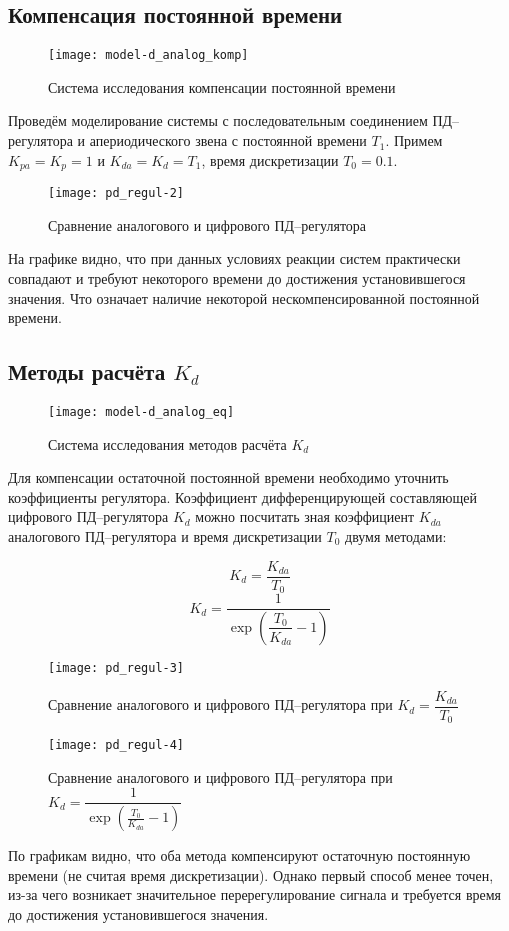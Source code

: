         \subsection{Компенсация постоянной времени}
            \begin{figure}[H]
                \centering\texttt{[image: model-d\_analog\_komp]}
                \caption{Система исследования компенсации постоянной времени}
            \end{figure}
            Проведём моделирование системы с последовательным соединением ПД--регулятора и апериодического звена с постоянной времени $ T_1 $. Примем $ K_{pa}=K_p=1 $ и $ K_{da} = K_d = T_1 $, время дискретизации $ T_0 = 0.1$.
            \begin{figure}[H]
                \centering\texttt{[image: pd\_regul-2]}
                \caption{Сравнение аналогового и цифрового ПД--регулятора}
            \end{figure}
            На графике видно, что при данных условиях реакции систем практически совпадают и требуют некоторого времени до достижения установившегося значения. Что означает наличие некоторой нескомпенсированной постоянной времени.

        \subsection{Методы расчёта $ K_d $}
            \begin{figure}[H]
                \centering\texttt{[image: model-d\_analog\_eq]}
                \caption{Система исследования методов расчёта $ K_d $}
            \end{figure}
            Для компенсации остаточной постоянной времени необходимо уточнить коэффициенты регулятора.
            Коэффициент дифференцирующей составляющей цифрового ПД--регулятора $ K_d $ можно посчитать зная коэффициент $ K_{da} $ аналогового ПД--регулятора и время дискретизации $ T_0 $ двумя методами:
            
            $$  K_d = \dfrac{K_{da}}{T_0}  $$ 
            $$  K_d = \dfrac{1}{\exp\left(\dfrac{T_0}{K_{da}}-1\right)}  $$
            \begin{figure}[H]
                \centering\texttt{[image: pd\_regul-3]}
                \caption{Сравнение аналогового и цифрового ПД--регулятора при $ K_d = \dfrac{K_{da}}{T_0} $}
            \end{figure}
            \begin{figure}[H]
                \centering\texttt{[image: pd\_regul-4]}
                \caption{Сравнение аналогового и цифрового ПД--регулятора при $ K_d = \dfrac{1}{\exp\left(\frac{T_0}{K_{da}}-1\right)} $}
            \end{figure}
            По графикам видно, что оба метода компенсируют остаточную постоянную времени (не считая время дискретизации). Однако первый способ менее точен, из-за чего возникает значительное перерегулирование сигнала и требуется время до достижения установившегося значения.
            
